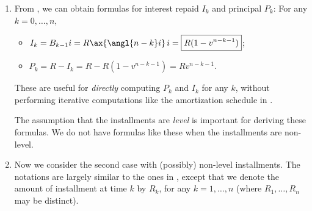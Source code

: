 \begin{enumerate}
\begin{center}
\end{center}
\item \label{it:amort-pk-ik-fmlas}
From , we can obtain formulas for interest
repaid \(I_k\) and principal \(P_k\): For any \(k=0,\dotsc,n\),
\begin{itemize}
\item \(I_k=B_{k-1}i=R\ax{\angl{n-k}i}\,i=\boxed{R(1-v^{n-k-1})}\);
\item \(P_k=R-I_k=R-R(1-v^{n-k-1})=\boxed{Rv^{n-k-1}}\).
\end{itemize}
These are useful for \emph{directly} computing \(P_k\) and \(I_k\) for any
\(k\), without performing iterative computations like the amortization schedule
in .

\begin{note}
The assumption that the installments are \emph{level} is important for deriving
these formulas. We do not have formulas like these when the installments are
non-level.
\end{note}

\item Now we consider the second case with (possibly) non-level installments. The
notations are largely similar to the ones in
, except that we denote the amount of
installment at time \(k\) by \(R_k\), for any \(k=1,\dotsc,n\) (where
\(R_1,\dotsc,R_n\) may be distinct).


\end{enumerate}
